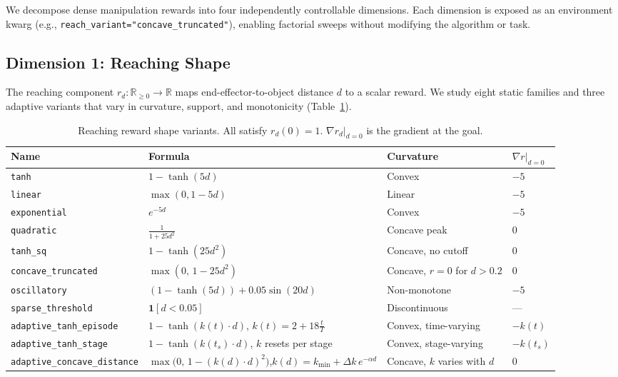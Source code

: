 \documentclass{article}
\begin{document}
We decompose dense manipulation rewards into four independently controllable dimensions.
Each dimension is exposed as an environment kwarg (e.g.,
\texttt{reach\_variant="concave\_truncated"}), enabling factorial sweeps without
modifying the algorithm or task.

\subsection{Dimension 1: Reaching Shape}

The reaching component $r_d : \mathbb{R}_{\geq 0} \to \mathbb{R}$ maps
end-effector-to-object distance $d$ to a scalar reward. We study eight static families
and three adaptive variants that vary in curvature, support, and monotonicity
(Table~\ref{tab:reach}).

\begin{table}[h]
\centering
\small
\caption{Reaching reward shape variants. All satisfy $r_d(0) = 1$.
$\nabla r_d|_{d=0}$ is the gradient at the goal.}
\label{tab:reach}
\begin{tabular}{@{}llll@{}}
\toprule
\textbf{Name} & \textbf{Formula} & \textbf{Curvature} & \textbf{$\nabla r|_{d=0}$} \\
\midrule
\texttt{tanh}              & $1 - \tanh(5d)$               & Convex & $-5$ \\
\texttt{linear}            & $\max(0, 1 - 5d)$             & Linear & $-5$ \\
\texttt{exponential}       & $e^{-5d}$                     & Convex & $-5$ \\
\texttt{quadratic}         & $\frac{1}{1+25d^2}$           & Concave peak & $0$ \\
\texttt{tanh\_sq}          & $1 - \tanh(25d^2)$            & Concave, no cutoff & $0$ \\
\texttt{concave\_truncated}& $\max(0,\, 1 - 25d^2)$        & Concave, $r=0$ for $d>0.2$ & $0$ \\
\texttt{oscillatory}       & $(1-\tanh(5d)) + 0.05\sin(20d)$ & Non-monotone & $-5$ \\
\texttt{sparse\_threshold} & $\mathbf{1}[d < 0.05]$        & Discontinuous & --- \\
\midrule
\texttt{adaptive\_tanh\_episode} & $1 - \tanh(k(t)\cdot d)$, $k(t)=2{+}18\tfrac{t}{T}$ & Convex, time-varying & $-k(t)$ \\
\texttt{adaptive\_tanh\_stage}   & $1 - \tanh(k(t_s)\cdot d)$, $k$ resets per stage & Convex, stage-varying & $-k(t_s)$ \\
\texttt{adaptive\_concave\_distance} & $\max\!\bigl(0,\,1-(k(d){\cdot}d)^2\bigr)$,\;$k(d)=k_{\min}+\Delta k\,e^{-\alpha d}$ & Concave, $k$ varies with $d$ & $0$ \\
\bottomrule
\end{tabular}
\end{table}
\end{document}
